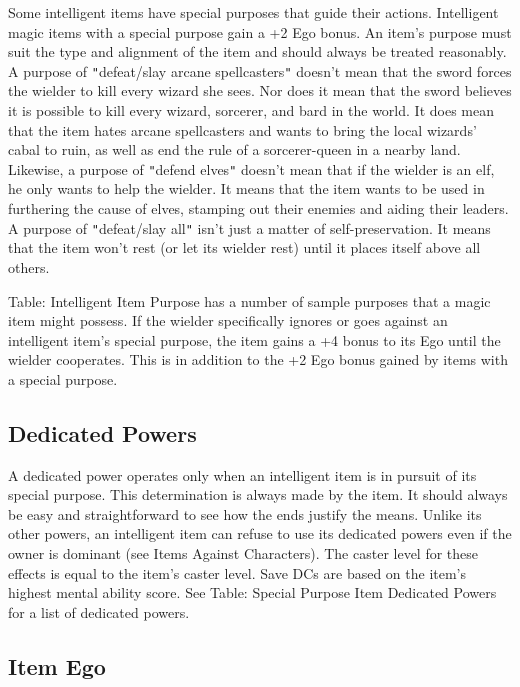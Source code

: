 				
Some intelligent items have special purposes that guide their actions. Intelligent magic items with a special purpose gain a +2 Ego bonus. An item's purpose must suit the type and alignment of the item and should always be treated reasonably. A purpose of \texttt{{}"{}}defeat/slay arcane spellcasters\texttt{{}"{}} doesn't mean that the sword forces the wielder to kill every wizard she sees. Nor does it mean that the sword believes it is possible to kill every wizard, sorcerer, and bard in the world. It does mean that the item hates arcane spellcasters and wants to bring the local wizards' cabal to ruin, as well as end the rule of a sorcerer-queen in a nearby land. Likewise, a purpose of \texttt{{}"{}}defend elves\texttt{{}"{}} doesn't mean that if the wielder is an elf, he only wants to help the wielder. It means that the item wants to be used in furthering the cause of elves, stamping out their enemies and aiding their leaders. A purpose of \texttt{{}"{}}defeat/slay all\texttt{{}"{}} isn't just a matter of self-preservation. It means that the item won't rest (or let its wielder rest) until it places itself above all others. 
				
Table: Intelligent Item Purpose has a number of sample purposes that a magic item might possess. If the wielder specifically ignores or goes against an intelligent item's special purpose, the item gains a +4 bonus to its Ego until the wielder cooperates. This is in addition to the +2 Ego bonus gained by items with a special purpose.
				
\subsection{Dedicated Powers}

				
A dedicated power operates only when an intelligent item is in pursuit of its special purpose. This determination is always made by the item. It should always be easy and straightforward to see how the ends justify the means. Unlike its other powers, an intelligent item can refuse to use its dedicated powers even if the owner is dominant (see Items Against Characters). The caster level for these effects is equal to the item's caster level. Save DCs are based on the item's highest mental ability score. See Table: Special Purpose Item Dedicated Powers for a list of dedicated powers.
				
\subsection{Item Ego}

